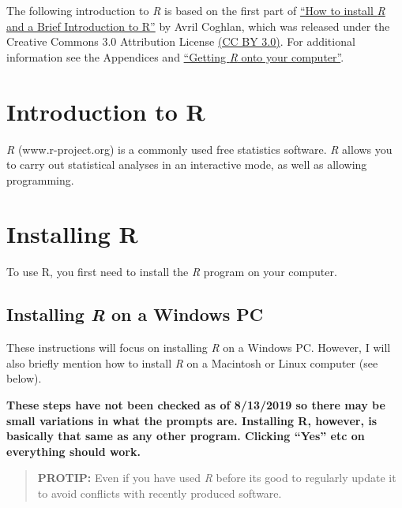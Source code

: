 \documentclass[
]{book}
\begin{document}
The following introduction to \emph{R} is based on the first part of \href{https://a-little-book-of-r-for-bioinformatics.readthedocs.io/en/latest/src/installr.html}{``How to install \emph{R} and a Brief Introduction to R''} by Avril Coghlan, which was released under the Creative Commons 3.0 Attribution License \href{https://creativecommons.org/licenses/by/3.0/}{(CC BY 3.0)}. For additional information see the Appendices and \href{https://brouwern.github.io/BOOK_R_Ecological_Data_Science/getting-r-onto-your-computer.html}{``Getting \emph{R} onto your computer''}.

\hypertarget{introduction-to-r}{%
\section{Introduction to R}\label{introduction-to-r}}

\emph{R} (www.r-project.org) is a commonly used free statistics software. \emph{R} allows you to carry out statistical analyses in an interactive mode, as well as allowing programming.

\hypertarget{installing-r}{%
\section{Installing R}\label{installing-r}}

To use R, you first need to install the \emph{R} program on your computer.

\hypertarget{installing-r-on-a-windows-pc}{%
\subsection{\texorpdfstring{Installing \emph{R} on a Windows PC}{Installing R on a Windows PC}}\label{installing-r-on-a-windows-pc}}

These instructions will focus on installing \emph{R} on a Windows PC. However, I will also briefly mention how to install \emph{R} on a Macintosh or Linux computer (see below).

\textbf{These steps have not been checked as of 8/13/2019 so there may be small variations in what the prompts are. Installing R, however, is basically that same as any other program. Clicking ``Yes'' etc on everything should work.}

\begin{quote}
\textbf{PROTIP:} Even if you have used \emph{R} before its good to regularly update it to avoid conflicts with recently produced software.
\end{quote}
\end{document}
